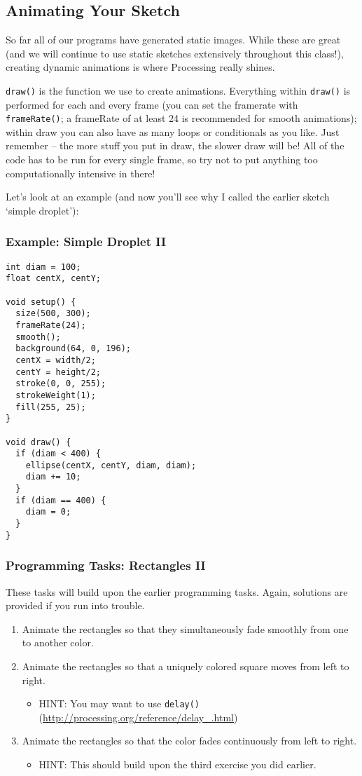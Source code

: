 \subsection{Animating Your Sketch}
So far all of our programs have generated static images.  While these are great (and we will continue to use static sketches extensively throughout this class!), creating dynamic animations is where Processing really shines.

\texttt{draw()} is the function we use to create animations.  Everything within \texttt{draw()} is performed for each and every frame (you can set the framerate with \texttt{frameRate()}; a frameRate of at least 24 is recommended for smooth animations); within draw you can also have as many loops or conditionals as you like.  Just remember -- the more stuff you put in draw, the slower draw will be!  All of the code has to be run for every single frame, so try not to put anything too computationally intensive in there!

Let's look at an example (and now you'll see why I called the earlier sketch `simple droplet'):

\subsubsection{Example: Simple Droplet II}
\begin{verbatim}
int diam = 100;
float centX, centY;

void setup() {
  size(500, 300);
  frameRate(24);
  smooth();
  background(64, 0, 196);
  centX = width/2;
  centY = height/2;
  stroke(0, 0, 255);
  strokeWeight(1);
  fill(255, 25);
}

void draw() {
  if (diam < 400) {
    ellipse(centX, centY, diam, diam);
    diam += 10;
  }
  if (diam == 400) {
    diam = 0;
  }
}
\end{verbatim}

\subsubsection{Programming Tasks: Rectangles II}
These tasks will build upon the earlier programming tasks.  Again, solutions are provided if you run into trouble.
\begin{enumerate}
\item Animate the rectangles so that they simultaneously fade smoothly from one to another color.
\item Animate the rectangles so that a uniquely colored square moves from left to right.
\begin{itemize}
\item HINT: You may want to use \texttt{delay()} (\url{http://processing.org/reference/delay_.html})
\end{itemize}
\item Animate the rectangles so that the color fades continuously from left to right.
\begin{itemize}
\item HINT: This should build upon the third exercise you did earlier.
\end{itemize}
\end{enumerate}

